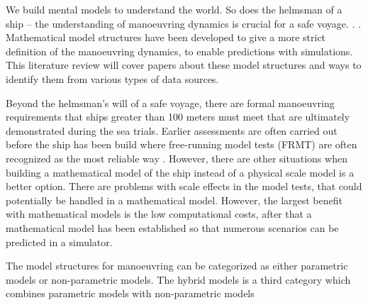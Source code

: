 We build mental models to understand the world. So does the helmsman of a ship – the understanding of manoeuvring dynamics is crucial for a safe voyage.  \cite{ljungModelingIdentificationDynamic2021}.  \cite{ljungPerspectivesSystemIdentification2010}.
Mathematical model structures have been developed to give a more strict definition of the manoeuvring dynamics, to enable predictions with simulations. This literature review will cover papers about these model structures and ways to identify them from various types of data sources.

Beyond the helmsman's will of a safe voyage, there are formal manoeuvring requirements that ships greater than 100 meters must meet  \cite{imoStandardsShipManoeuvrability2002} that are ultimately demonstrated during the sea trials. Earlier assessments are often carried out before the ship has been build where free-running model tests (FRMT) are often recognized as the most reliable way \cite{ittcManeuveringCommitteeITTC2008}. However, there are other situations when building a mathematical model of the ship instead of a physical scale model is a better option.  There are problems with scale effects in the model tests, that could potentially be handled in a mathematical model.  However, the largest benefit with mathematical models is the low  computational costs, after that a mathematical model has been established so that numerous scenarios can be predicted in a simulator.

The model structures for manoeuvring can be categorized as either parametric models or non-parametric models. The hybrid models is a third category which combines parametric models with non-parametric models  
